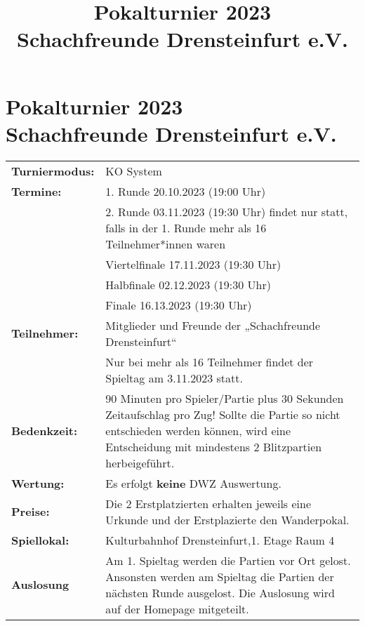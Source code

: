 \documentclass[a4paper,parskip=full-,DIV18]{scrartcl}
\title{Pokalturnier 2023\\Schachfreunde Drensteinfurt e.V.}
\begin{document}
\section*{Pokalturnier 2023\\Schachfreunde Drensteinfurt e.V.}

\begin{tabular}{p{3 cm} p{13.5 cm}}
	\textbf{Turniermodus:} & KO System                                                                                 \\
	\textbf{Termine:}      & 1. Runde   20.10.2023 (19:00 Uhr)                                           \\
	                       & 2. Runde   03.11.2023 (19:30 Uhr) findet nur statt, falls in der 1. Runde mehr als 16 Teilnehmer*innen waren                                          \\
	                       & Viertelfinale 17.11.2023 (19:30 Uhr)                                                   \\
	                       & Halbfinale 02.12.2023 (19:30 Uhr)                                                          \\
	                       & Finale 16.13.2023 (19:30 Uhr)                                                          \\
	\textbf{Teilnehmer:}   & Mitglieder und Freunde der „Schachfreunde Drensteinfurt“                                   \\
	\textbf{}              & Nur bei mehr als 16 Teilnehmer findet der Spieltag am 3.11.2023 statt. \\
	\textbf{Bedenkzeit:}   & 90 Minuten pro Spieler/Partie plus 30 Sekunden Zeitaufschlag pro Zug! Sollte die Partie so nicht entschieden werden können, wird eine Entscheidung mit  mindestens 2 Blitzpartien herbeigeführt.                      \\
	\textbf{Wertung:}      & Es erfolgt \textbf{keine} DWZ Auswertung.                                                  \\
	\textbf{Preise:}       & Die 2 Erstplatzierten erhalten jeweils eine Urkunde und der Erstplazierte den Wanderpokal. \\
	\textbf{Spiellokal:}   & Kulturbahnhof Drensteinfurt,1. Etage Raum 4\\
    \textbf {Auslosung} & Am 1. Spieltag werden die Partien vor Ort gelost. Ansonsten werden am Spieltag die Partien der nächsten Runde ausgelost. Die Auslosung wird auf der Homepage mitgeteilt.\\

\end{tabular}
\end{document}
